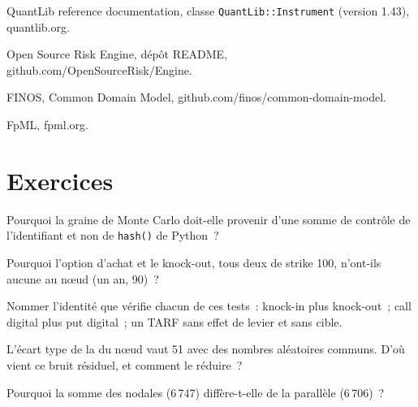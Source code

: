 \begin{omsources}
\item QuantLib reference documentation, classe \texttt{QuantLib::Instrument} (version 1.43), quantlib.org.
\item Open Source Risk Engine, dépôt README, github.com/OpenSourceRisk/Engine.
\item FINOS, Common Domain Model, github.com/finos/common-domain-model.
\item FpML, fpml.org.
\end{omsources}

\section{Exercices}

\begin{exercise}[$\star$]\label{exo:dv:build-a-pricing-library:1}
Pourquoi la graine de Monte Carlo doit-elle provenir d'une somme de contrôle de l'identifiant et non de \texttt{hash()} de Python~?
\end{exercise}

\begin{exercise}[$\star$]\label{exo:dv:build-a-pricing-library:2}
Pourquoi l'option d'achat et le knock-out, tous deux de strike 100, n'ont-ils aucune  au nœud (un an, 90)~?
\end{exercise}

\begin{exercise}[$\star$]\label{exo:dv:build-a-pricing-library:3}
Nommer l'identité que vérifie chacun de ces tests~: knock-in plus knock-out~; call digital plus put digital~; un TARF sans effet de levier et sans cible.
\end{exercise}

\begin{exercise}[$\star\star$]\label{exo:dv:build-a-pricing-library:4}
L'écart type de la  du nœud vaut 51 avec des nombres aléatoires communs. D'où vient ce bruit résiduel, et comment le réduire~?
\end{exercise}

\begin{exercise}[$\star\star$]\label{exo:dv:build-a-pricing-library:5}
Pourquoi la somme des  nodales (6\,747) diffère-t-elle de la  parallèle (6\,706)~?
\end{exercise}

